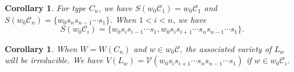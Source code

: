 \documentclass[11pt, reqno]{amsart}
\newtheorem{cor}[Thm]{Corollary}
\theoremstyle{definition}
\numberwithin{equation}{section}
\begin{document}




\begin{cor}
    For type $C_n$, we have $S(w_0\mathcal{C}_1)=w_0\mathcal{C}_1$ and  $S(w_0\mathcal{C}_n)=\{w_0s_ns_{n-1}\cdots s_1\}$.  When $1<i< n$, we have 
    $$S(w_0\mathcal{C}_i)=\{w_0s_is_{i-1}\cdots s_1, w_0s_is_{i+1}\cdots s_ns_{n-1}\cdots s_{1}\}.$$
\end{cor}

\begin{cor}
    When $W=W(C_n)$ and $w\in w_0\mathcal{C}$, the associated variety of $L_w$ will be irreducible. We have $V(L_w)=\mathcal{V}(w_0s_is_{i+1}\cdots s_ns_{n-1}\cdots s_{1})$ if $w\in w_0\mathcal{C}_i$.
\end{cor}
\end{document}
